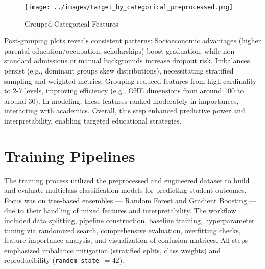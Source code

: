 \documentclass[twoside,final]{hcmut-report}
\begin{document}
\begin{figure}[H]
  \centering
  \texttt{[image: ../images/target\_by\_categorical\_preprocessed.png]}
  \caption{Grouped Categorical Features}
  \label{grouped_cat}
\end{figure}

Post-grouping plots reveals consistent patterns: Socioeconomic advantages (higher parental education/occupation, scholarships) boost graduation, while non-standard admissions or manual backgrounds increase dropout risk. Imbalances persist (e.g., dominant groups skew distributions), necessitating stratified sampling and weighted metrics. Grouping reduced features from high-cardinality to 2-7 levels, improving efficiency (e.g., OHE dimensions from around 100 to around 30). In modeling, these features ranked moderately in importances, interacting with academics. Overall, this step enhanced predictive power and interpretability, enabling targeted educational strategies.

\section{Training Pipelines}
The training process utilized the preprocessed and engineered dataset to build and evaluate multiclass classification models for predicting student outcomes. Focus was on tree-based ensembles — Random Forest and Gradient Boosting — due to their handling of mixed features and interpretability. The workflow included data splitting, pipeline construction, baseline training, hyperparameter tuning via randomized search, comprehensive evaluation, overfitting checks, feature importance analysis, and visualization of confusion matrices. All steps emphasized imbalance mitigation (stratified splits, class weights) and reproducibility (\texttt{random\_state}~$=42$).
\end{document}
